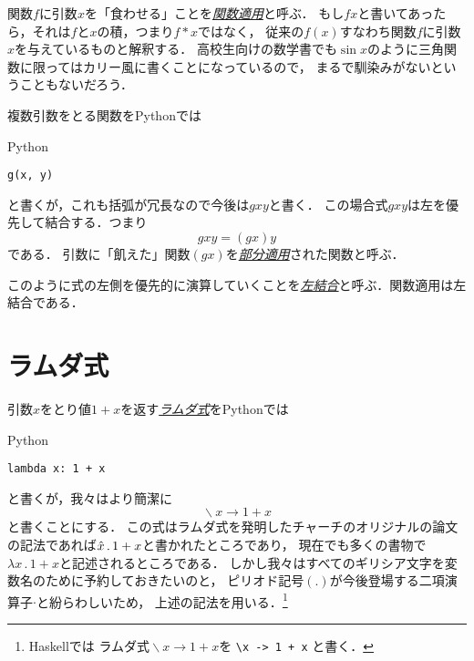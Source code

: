 \documentclass[a5paper,draft]{jsbook}
\newcommand{\programminglanguage}[1]{\textsf{#1}}
\newcommand{\haskell}{\programminglanguage{Haskell}}
\newcommand{\python}{\programminglanguage{Python}}
\newcommand{\keyword}[1]{{\underline{\emph{#1}}}}
\newcommand{\code}[1]{\texttt{#1}}
\newenvironment{pythoncode}{\begin{itembox}[r]{\python}}{\end{itembox}}
\newcommand{\pthnId}[1]{{DO NOT USE}--\textit{#1}}
\newcommand{\pthnKeyword}[1]{{DO NOT USE}--\textbf{#1}}
\newcommand{\pthnOp}[1]{{DO NOT USE}--\texttt{#1}}
\newcommand{\mathUnaryOperator}[1]{\operatorname{#1}}
\newcommand{\mathLambda}{\mathUnaryOperator{\backslash}}
\newcommand{\mathLambdaArrow}{\rightarrow}
\newcommand{\mathLambdaExpression}[2]{\mathLambda#1\mathLambdaArrow#2}
\begin{document}

関数$f$に引数$x$を「食わせる」ことを\keyword{関数適用}と呼ぶ．
もし$fx$と書いてあったら，それは$f$と$x$の積，つまり$f*x$ではなく，
従来の$f\left(x\right)$すなわち関数$f$に引数$x$を与えているものと解釈する．
高校生向けの数学書でも$\sin x$のように三角関数に限ってはカリー風に書くことになっているので，
まるで馴染みがないということもないだろう．

複数引数をとる関数を\python では
\begin{pythoncode}
\begin{verbatim}
g(x, y)
\end{verbatim}
\end{pythoncode}
と書くが，これも括弧が冗長なので今後は$gxy$と書く．
この場合式$gxy$は左を優先して結合する．つまり
\begin{equation}
gxy=\left(gx\right)y
\end{equation}
である．
引数に「飢えた」関数$\left(gx\right)$を\keyword{部分適用}された関数と呼ぶ．

このように式の左側を優先的に演算していくことを\keyword{左結合}と呼ぶ．関数適用は左結合である．

\section{ラムダ式}

引数$x$をとり値$1+x$を返す\keyword{ラムダ式}を\python では
\begin{pythoncode}
\begin{verbatim}
lambda x: 1 + x
\end{verbatim}
\end{pythoncode}
と書くが，我々はより簡潔に
\begin{equation}
\mathLambdaExpression{x}{1+x}
\end{equation}
と書くことにする．
この式はラムダ式を発明したチャーチのオリジナルの論文の記法であれば$\Hat x\,.\,1+x$と書かれたところであり，
現在でも多くの書物で$\lambda x\,.\,1+x$と記述されるところである．
しかし我々はすべてのギリシア文字を変数名のために予約しておきたいのと，
ピリオド記号$\left(.\right)$が今後登場する二項演算子$\cdot$と紛らわしいため，
上述の記法を用いる．\footnote{\haskell では
ラムダ式$\mathLambdaExpression{x}{1+x}$を \code{\textbackslash x -> 1 + x} と書く．}
\end{document}
